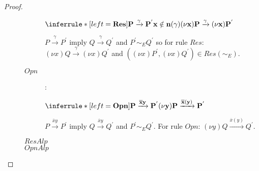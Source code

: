 \begin{lemma}
\begin{proof}
\begin{description}
\begin{description}
	    \begin{center}
	      $\inferrule* [left=\bf{Res}]{
		  P \xrightarrow{\gamma} P^{'}
		\\
		  x \notin n(\gamma)
	      }{
		(\nu x)P \xrightarrow{\gamma} (\nu x)P^{'}
	      }$
	    \end{center}
	    $P \xrightarrow{\gamma} P^{'}$ imply $Q \xrightarrow{\gamma} Q^{'}$ and $P^{'} \sim_{E} Q^{'}$ so for rule $Res$: $(\nu x)Q \xrightarrow{\gamma} (\nu x)Q^{'}$ and $((\nu x)P^{'}, (\nu x)Q^{'})\in Res(\sim_{E})$. 
	  \item[$Opn$]:
	    \begin{center}
	      $\inferrule* [left=\bf{Opn}]{
		  P \xrightarrow{\overline{x}y} P^{'}
	      }{
		(\nu y)P \xrightarrow{\overline{x}(y)} P^{'}
	      }$
	    \end{center}
	    $P \xrightarrow{\overline{x}y} P^{'}$ imply $Q \xrightarrow{\overline{x}y} Q^{'}$ and $P^{'} \sim_{E} Q^{'}$. For rule $Opn$: $(\nu y)Q \xrightarrow{\overline{x}(y)} Q^{'}$.
	  \item[$ResAlp$]
	    
	  \item[$OpnAlp$]
	    

\end{description}
\end{description}
\end{proof}
\end{lemma}
